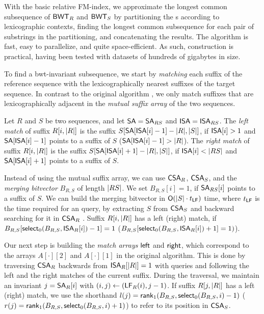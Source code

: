 With the basic relative FM-index, we approximate the longest common
subsequence of $\mathsf{BWT}_{R}$ and $\mathsf{BWT}_{S}$ by partitioning the \BWT{}s according
to lexicographic contexts, finding the longest common subsequence for each
pair of substrings in the partitioning, and concatenating the results. The
algorithm is fast, easy to parallelize, and quite space-efficient. As such,
\RFM{} construction is practical, having been tested with datasets of hundreds
of gigabytes in size.

To find a bwt-invariant subsequence, we start by \emph{matching} each suffix
of the reference sequence with the lexicographically nearest suffixes of the
target sequence. In contrast to the original algorithm \cite{Belazzougui2014}, we
only match suffixes that are lexicographically adjacent in the \emph{mutual
suffix array} of the two sequences.

\begin{definition}
Let $R$ and $S$ be two sequences, and let $\mathsf{SA} = \mathsf{SA}_{RS}$ and $\mathsf{ISA} =
\mathsf{ISA}_{RS}$. The \emph{left match} of suffix $R[i,\lvert R \rvert]$ is the suffix
$S[\mathsf{SA}[\mathsf{ISA}[i]-1] - \lvert R \rvert, \lvert S \rvert]$, if $\mathsf{ISA}[i] > 1$ and
$\mathsf{SA}[\mathsf{ISA}[i]-1]$ points to a suffix of $S$ ($\mathsf{SA}[\mathsf{ISA}[i]-1] > \lvert R \rvert$).
The \emph{right match} of suffix $R[i,\lvert R \rvert]$ is the suffix
$S[\mathsf{SA}[\mathsf{ISA}[i]+1] - \lvert R \rvert, \lvert S \rvert]$, if $\mathsf{ISA}[i] < \lvert RS \rvert$ and
$\mathsf{SA}[\mathsf{ISA}[i]+1]$ points to a suffix of $S$.
\end{definition}

Instead of using the mutual suffix array, we can use $\mathsf{CSA}_{R}$, $\mathsf{CSA}_{S}$,
and the \emph{merging bitvector} $B_{R,S}$ of length $\lvert RS \rvert$. We set
$B_{R,S}[i] = 1$, if $\mathsf{SA}_{RS}[i]$ points to a suffix of $S$. We can build the
merging bitvector in $\mathsf{O}(\lvert S \rvert \cdot t_{\mathsf{LF}})$ time, where $t_{\mathsf{LF}}$ is
the time required for an \LF{} query, by extracting $S$ from $\mathsf{CSA}_{S}$ and
backward searching for it in $\mathsf{CSA}_{R}$ \cite{Siren2009}. Suffix
$R[i,\lvert R \rvert]$ has a left (right) match, if $B_{R,S}[\mathsf{select}_{0}(B_{R,S},
\mathsf{ISA}_{R}[i])-1] = 1$ ($B_{R,S}[\mathsf{select}_{0}(B_{R,S}, \mathsf{ISA}_{R}[i])+1] = 1)$).

Our next step is building the \emph{match arrays} $\mathsf{left}$ and $\mathsf{right}$,
which correspond to the arrays $A[\cdot][2]$ and $A[\cdot][1]$ in the original
algorithm. This is done by traversing $\mathsf{CSA}_{R}$ backwards from
$\mathsf{ISA}_{R}[\lvert R \rvert] = 1$ with \LF{} queries and following the left and the
right matches of the current suffix. During the traversal, we maintain
an invariant $j = \mathsf{SA}_{R}[i]$ with $(i,j) \leftarrow (\mathsf{LF}_{R}(i), j-1)$. If
suffix $R[j,\lvert R \rvert]$ has a left (right) match, we use the shorthand $l(j) =
\mathsf{rank}_{1}(B_{R,S}, \mathsf{select}_{0}(B_{R,S}, i)-1)$ ($r(j) = \mathsf{rank}_{1}(B_{R,S},
\mathsf{select}_{0}(B_{R,S}, i)+1)$) to refer to its position in $\mathsf{CSA}_{S}$.

